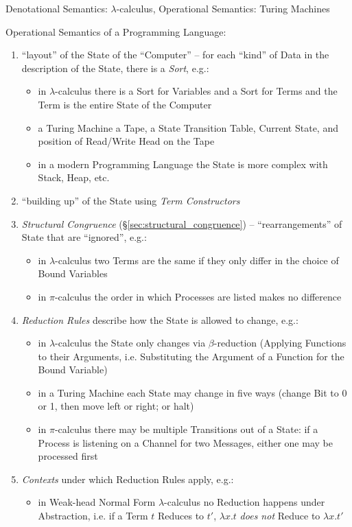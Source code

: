 Denotational Semantics: $\lambda$-calculus, Operational Semantics:
Turing Machines

Operational Semantics of a Programming Language:
\begin{enumerate}
  \item ``layout'' of the State of the ``Computer'' -- for each
    ``kind'' of Data in the description of the State, there is a
    \emph{Sort}, e.g.:
    \begin{itemize}
      \item in $\lambda$-calculus there is a Sort for Variables and a
        Sort for Terms and the Term is the entire State of the
        Computer
      \item a Turing Machine a Tape, a State Transition Table, Current
        State, and position of Read/Write Head on the Tape
      \item in a modern Programming Language the State is more complex
        with Stack, Heap, etc.
    \end{itemize}
  \item ``building up'' of the State using \emph{Term Constructors}
  \item \emph{Structural Congruence} (\S\ref{sec:structural_congruence}) --
    ``rearrangements'' of State that are ``ignored'', e.g.:
    \begin{itemize}
      \item in $\lambda$-calculus two Terms are the same if they only
        differ in the choice of Bound Variables
      \item in $\pi$-calculus the order in which Processes are listed
        makes no difference
    \end{itemize}
  \item \emph{Reduction Rules} describe how the State is allowed to
    change, e.g.:
    \begin{itemize}
      \item in $\lambda$-calculus the State only changes via
        $\beta$-reduction (Applying Functions to their Arguments, i.e.
        Substituting the Argument of a Function for the Bound Variable)
      \item in a Turing Machine each State may change in five ways
        (change Bit to 0 or 1, then move left or right; or halt)
      \item in $\pi$-calculus there may be multiple Transitions out of a
        State: if a Process is listening on a Channel for two Messages,
        either one may be processed first
    \end{itemize}
  \item \emph{Contexts} under which Reduction Rules apply, e.g.:
    \begin{itemize}
      \item in Weak-head Normal Form $\lambda$-calculus no Reduction
        happens under Abstraction, i.e. if a Term $t$ Reduces to $t'$,
        $\lambda x.t$ \emph{does not} Reduce to $\lambda x.t'$
    \end{itemize}
\end{enumerate}


